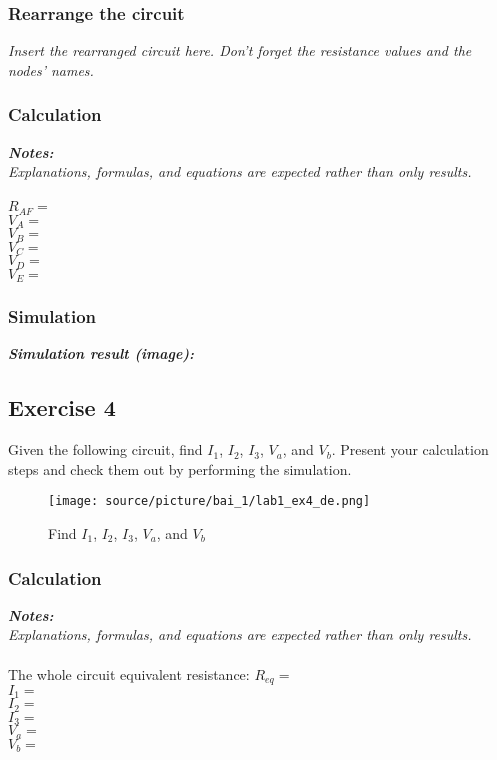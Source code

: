 \subsubsection{Rearrange the circuit}
\textit{Insert the rearranged circuit here. Don't forget the resistance values and the nodes' names.}
\newpage

\subsubsection{Calculation}
\textit{\textbf{Notes:}}\\
\textit{Explanations, formulas, and equations are expected rather than only results.}\\
\\
$R_{AF} =$ \dotfill\bigskip\\
$V_A = $ \dotfill\bigskip\\
$V_B = $ \dotfill\bigskip\\
$V_C = $ \dotfill\bigskip\\
$V_D = $ \dotfill\bigskip\\
$V_E = $ \dotfill\bigskip\\

\subsubsection{Simulation}
\textit{\textbf{Simulation result (image):}}
\newpage

\subsection{Exercise 4}
Given the following circuit, find $I_1$, $I_2$, $I_3$, $V_a$, and $V_b$. Present your calculation steps and check them out by performing the simulation.

\begin{figure}[H]
    \centering
    \texttt{[image: source/picture/bai\_1/lab1\_ex4\_de.png]}
    \caption{Find $I_1$, $I_2$, $I_3$, $V_a$, and $V_b$}
    \label{lab1_ex4_de}
\end{figure}

\subsubsection{Calculation}
\textit{\textbf{Notes:}}\\
\textit{Explanations, formulas, and equations are expected rather than only results.}\\
\\
The whole circuit equivalent resistance: $R_{eq} =$ \dotfill\medskip\\
$I_1 =$\dotfill\bigskip\\
$I_2 =$\dotfill\bigskip\\
$I_3 =$\dotfill\bigskip\\
$V_a =$\dotfill\bigskip\\
$V_b =$\dotfill\bigskip\\


